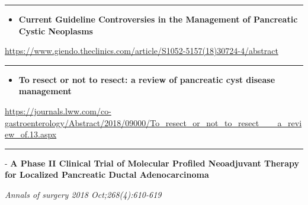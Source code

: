 \documentclass[]{article}
\providecommand{\tightlist}{%
  \setlength{\itemsep}{0pt}\setlength{\parskip}{0pt}}
\begin{document}
\begin{center}\rule{0.5\linewidth}{\linethickness}\end{center}

\begin{itemize}
\tightlist
\item
  \textbf{Current Guideline Controversies in the Management of
  Pancreatic Cystic Neoplasms}
\end{itemize}

\url{https://www.giendo.theclinics.com/article/S1052-5157(18)30724-4/abstract}

\begin{center}\rule{0.5\linewidth}{\linethickness}\end{center}

\begin{itemize}
\tightlist
\item
  \textbf{To resect or not to resect: a review of pancreatic cyst
  disease management}
\end{itemize}

\url{https://journals.lww.com/co-gastroenterology/Abstract/2018/09000/To_resect_or_not_to_resect___a_review_of.13.aspx}

\begin{center}\rule{0.5\linewidth}{\linethickness}\end{center}

 - \textbf{A Phase II Clinical Trial of Molecular Profiled Neoadjuvant
Therapy for Localized Pancreatic Ductal Adenocarcinoma}

\emph{Annals of surgery 2018 Oct;268(4):610-619}
\end{document}
